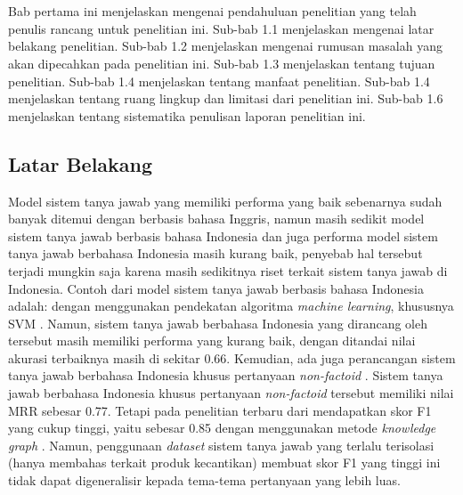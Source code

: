 \chapter{\babSatu}
\label{bab:1}
Bab pertama ini menjelaskan mengenai pendahuluan penelitian yang telah penulis rancang untuk penelitian ini. Sub-bab 1.1 menjelaskan mengenai latar belakang penelitian. Sub-bab 1.2 menjelaskan mengenai rumusan masalah yang akan dipecahkan pada penelitian ini. Sub-bab 1.3 menjelaskan tentang tujuan penelitian. Sub-bab 1.4 menjelaskan tentang manfaat penelitian. Sub-bab 1.4 menjelaskan tentang ruang lingkup dan limitasi dari penelitian ini. Sub-bab 1.6 menjelaskan tentang sistematika penulisan laporan penelitian ini.

\section{Latar Belakang}
Model sistem tanya jawab yang memiliki performa yang baik sebenarnya sudah banyak ditemui dengan berbasis bahasa Inggris, namun masih sedikit model sistem tanya jawab berbasis bahasa Indonesia dan juga performa model sistem tanya jawab berbahasa Indonesia masih kurang baik, penyebab hal tersebut terjadi mungkin saja karena masih sedikitnya riset terkait sistem tanya jawab di Indonesia. Contoh dari model sistem tanya jawab berbasis bahasa Indonesia adalah: dengan menggunakan pendekatan algoritma \emph{machine learning}, khususnya SVM \citep{machine-learning-approach}. Namun, sistem tanya jawab berbahasa Indonesia yang dirancang oleh \citeauthor{machine-learning-approach} tersebut masih memiliki performa yang kurang baik, dengan ditandai nilai akurasi terbaiknya masih di sekitar 0.66. Kemudian, ada juga perancangan sistem tanya jawab berbahasa Indonesia khusus pertanyaan \emph{non-factoid} \citep{Purwarianti_Yusliani_2012}. Sistem tanya jawab berbahasa Indonesia khusus pertanyaan \emph{non-factoid} tersebut memiliki nilai MRR sebesar 0.77. Tetapi pada penelitian terbaru dari \citeauthor{JLK} mendapatkan skor F1 yang cukup tinggi, yaitu sebesar 0.85 dengan menggunakan metode \emph{knowledge graph} \citep{JLK}. Namun, penggunaan \emph{dataset} sistem tanya jawab yang terlalu terisolasi (hanya membahas terkait produk kecantikan) membuat skor F1 yang tinggi ini tidak dapat digeneralisir kepada tema-tema pertanyaan yang lebih luas.

